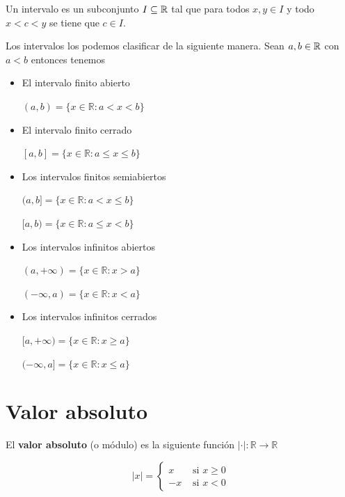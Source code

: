 \begin{definition}[Intervalo] 

Un intervalo es un subconjunto $I \subseteq \mathbb{R}$ tal que para todos $x,y \in I$ y todo $x < c < y$ se tiene que $c \in I$.

Los intervalos los podemos clasificar de la siguiente manera.  Sean $a,b \in \mathbb{R}$ con $a<b$ entonces tenemos

\begin{itemize}

\item El intervalo finito abierto 

$(a,b) = \{ x \in \mathbb{R} : a < x < b \}$

\item El intervalo finito cerrado

$[a,b] = \{ x \in \mathbb{R} : a \leq x \leq b \}$

\item Los intervalos finitos semiabiertos

$(a,b] = \{ x \in \mathbb{R} : a < x \leq b \}$

$[a,b) = \{ x \in \mathbb{R} : a \leq x < b \}$

\item Los intervalos infinitos abiertos

$(a, +\infty) = \{ x \in \mathbb{R} : x > a \}$

$(-\infty, a) = \{ x \in \mathbb{R} : x < a \}$

\item Los intervalos infinitos cerrados

$[a, +\infty) = \{ x \in \mathbb{R} : x \geq a \}$

$(-\infty, a] = \{ x \in \mathbb{R} : x \leq a \}$

\end{itemize}
\end{definition}



\section{Valor absoluto}

\begin{definition} \label{funcion_modulo} 
El \textbf{valor absoluto} (o módulo) es la siguiente función $| \cdot | : \mathbb{R} \to \mathbb{R}$

$$ |x| = \begin{cases} x & \textrm{ si } x \geq 0 \\ -x & \textrm{ si } x < 0 \end{cases} $$

\end{definition}

